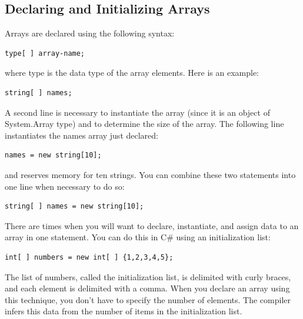 \documentclass[12pt,a4paper,final,twoside,titlepage]{book}
\begin{document}
\subsection{Declaring and Initializing Arrays}
Arrays are declared using the following syntax:
\begin{lstlisting}
type[ ] array-name;
\end{lstlisting}
where type is the data type of the array elements. Here is an example:
\begin{lstlisting}
string[ ] names;
\end{lstlisting}
A second line is necessary to instantiate the array (since it is an object of System.Array type) and to determine the size of the array. The following line instantiates the names array just declared:
\begin{lstlisting}
names = new string[10];
\end{lstlisting}
and reserves memory for ten strings. You can combine these two statements into one line when necessary to do so:
\begin{lstlisting}
string[ ] names = new string[10];
\end{lstlisting}
There are times when you will want to declare, instantiate, and assign data to an array in one statement. You can do this in C\# using an initialization list:
\begin{lstlisting}
int[ ] numbers = new int[ ] {1,2,3,4,5};
\end{lstlisting}
The list of numbers, called the initialization list, is delimited with curly braces, and each element is delimited with a comma. When you declare an array using this technique, you don’t have to specify the number of elements. The compiler infers this data from the number of items in the initialization list.
\end{document}
